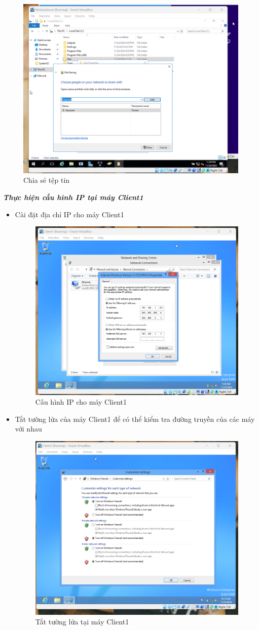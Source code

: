 \begin{itemize}
    \begin{figure}[htbp]
        \centering
        \includegraphics[width=0.6\linewidth]{RemoteAccessVPNimg/ShareFile_SV (2).png}
        \caption{Chia sẻ tệp tin}
    \end{figure}
 \end{itemize}

\newpage
\textbf{\textit{Thực hiện cấu hình IP tại máy Client1}}
\begin{itemize}
      \item Cài đặt địa chỉ IP cho máy Client1

    \begin{figure}[htbp]
        \centering
        \includegraphics[width=0.5\linewidth]{RemoteAccessVPNimg/setIP_CLient.png}
        \caption{Cấu hình IP cho máy Client1}
    \end{figure}
      
    \item Tắt tường lửa của máy Client1 để có thể kiểm tra đường truyền của các máy với nhau 

    \begin{figure}[htbp]
        \centering
        \includegraphics[width=0.5\linewidth]{RemoteAccessVPNimg/Firewall_Client.png}
        \caption{Tắt tường lửa tại máy Client1}
    \end{figure}
 \end{itemize}


